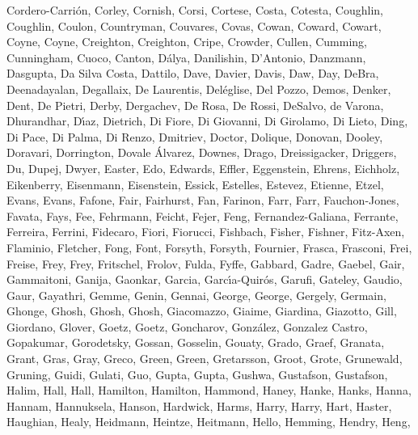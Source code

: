\documentclass[times,tight]{aastex631}
\begin{document}
\begin{thebibliography}{}
{  {Cordero-Carri{\'o}n}, {Corley}, {Cornish}, {Corsi}, {Cortese}, {Costa},
  {Cotesta}, {Coughlin}, {Coughlin}, {Coulon}, {Countryman}, {Couvares},
  {Covas}, {Cowan}, {Coward}, {Cowart}, {Coyne}, {Coyne}, {Creighton},
  {Creighton}, {Cripe}, {Crowder}, {Cullen}, {Cumming}, {Cunningham}, {Cuoco},
  {Canton}, {D{\'a}lya}, {Danilishin}, {D'Antonio}, {Danzmann}, {Dasgupta}, {Da
  Silva Costa}, {Dattilo}, {Dave}, {Davier}, {Davis}, {Daw}, {Day}, {DeBra},
  {Deenadayalan}, {Degallaix}, {De Laurentis}, {Del{\'e}glise}, {Del Pozzo},
  {Demos}, {Denker}, {Dent}, {De Pietri}, {Derby}, {Dergachev}, {De Rosa}, {De
  Rossi}, {DeSalvo}, {de Varona}, {Dhurandhar}, {D{\'\i}az}, {Dietrich}, {Di
  Fiore}, {Di Giovanni}, {Di Girolamo}, {Di Lieto}, {Ding}, {Di Pace}, {Di
  Palma}, {Di Renzo}, {Dmitriev}, {Doctor}, {Dolique}, {Donovan}, {Dooley},
  {Doravari}, {Dorrington}, {Dovale {\'A}lvarez}, {Downes}, {Drago},
  {Dreissigacker}, {Driggers}, {Du}, {Dupej}, {Dwyer}, {Easter}, {Edo},
  {Edwards}, {Effler}, {Eggenstein}, {Ehrens}, {Eichholz}, {Eikenberry},
  {Eisenmann}, {Eisenstein}, {Essick}, {Estelles}, {Estevez}, {Etienne},
  {Etzel}, {Evans}, {Evans}, {Fafone}, {Fair}, {Fairhurst}, {Fan}, {Farinon},
  {Farr}, {Farr}, {Fauchon-Jones}, {Favata}, {Fays}, {Fee}, {Fehrmann},
  {Feicht}, {Fejer}, {Feng}, {Fernandez-Galiana}, {Ferrante}, {Ferreira},
  {Ferrini}, {Fidecaro}, {Fiori}, {Fiorucci}, {Fishbach}, {Fisher}, {Fishner},
  {Fitz-Axen}, {Flaminio}, {Fletcher}, {Fong}, {Font}, {Forsyth}, {Forsyth},
  {Fournier}, {Frasca}, {Frasconi}, {Frei}, {Freise}, {Frey}, {Frey},
  {Fritschel}, {Frolov}, {Fulda}, {Fyffe}, {Gabbard}, {Gadre}, {Gaebel},
  {Gair}, {Gammaitoni}, {Ganija}, {Gaonkar}, {Garcia},
  {Garc{\'\i}a-Quir{\'o}s}, {Garufi}, {Gateley}, {Gaudio}, {Gaur}, {Gayathri},
  {Gemme}, {Genin}, {Gennai}, {George}, {George}, {Gergely}, {Germain},
  {Ghonge}, {Ghosh}, {Ghosh}, {Ghosh}, {Giacomazzo}, {Giaime}, {Giardina},
  {Giazotto}, {Gill}, {Giordano}, {Glover}, {Goetz}, {Goetz}, {Goncharov},
  {Gonz{\'a}lez}, {Gonzalez Castro}, {Gopakumar}, {Gorodetsky}, {Gossan},
  {Gosselin}, {Gouaty}, {Grado}, {Graef}, {Granata}, {Grant}, {Gras}, {Gray},
  {Greco}, {Green}, {Green}, {Gretarsson}, {Groot}, {Grote}, {Grunewald},
  {Gruning}, {Guidi}, {Gulati}, {Guo}, {Gupta}, {Gupta}, {Gushwa}, {Gustafson},
  {Gustafson}, {Halim}, {Hall}, {Hall}, {Hamilton}, {Hamilton}, {Hammond},
  {Haney}, {Hanke}, {Hanks}, {Hanna}, {Hannam}, {Hannuksela}, {Hanson},
  {Hardwick}, {Harms}, {Harry}, {Harry}, {Hart}, {Haster}, {Haughian}, {Healy},
  {Heidmann}, {Heintze}, {Heitmann}, {Hello}, {Hemming}, {Hendry}, {Heng},
}
\end{thebibliography}
\end{document}
